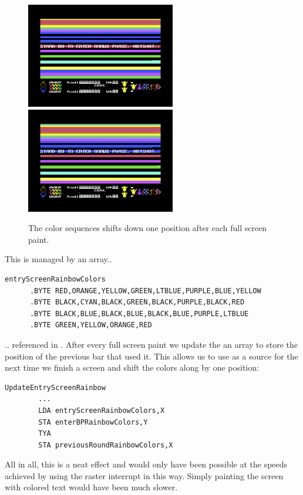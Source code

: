 \begin{figure}[H]
    \centering
    \includegraphics[width=6.5cm]{bonusphase/entry/bonus_entry_from.png}%
    \includegraphics[width=6.5cm]{bonusphase/entry/bonus_entry_to.png}%
  \caption{The color sequences shifts down one position after each full screen paint.}
\end{figure}

This is managed by an array..

\begin{lstlisting}
entryScreenRainbowColors
      .BYTE RED,ORANGE,YELLOW,GREEN,LTBLUE,PURPLE,BLUE,YELLOW
      .BYTE BLACK,CYAN,BLACK,GREEN,BLACK,PURPLE,BLACK,RED
      .BYTE BLACK,BLUE,BLACK,BLUE,BLACK,BLUE,PURPLE,LTBLUE
      .BYTE GREEN,YELLOW,ORANGE,RED
\end{lstlisting}

.. referenced in . After every full screen paint we update the an
array  to store the position of the previous bar that used it.
This allows us to use  as a source for  the next time
we finish a screen and shift the colors along by one position:

\begin{lstlisting}
UpdateEntryScreenRainbow   
        ...
        LDA entryScreenRainbowColors,X
        STA enterBPRainbowColors,Y
        TYA 
        STA previousRoundRainbowColors,X
\end{lstlisting}

All in all, this is a neat effect and would only have been possible at the speeds achieved by using
the raster interrupt in this way. Simply painting the screen with colored text would have been much
slower.

